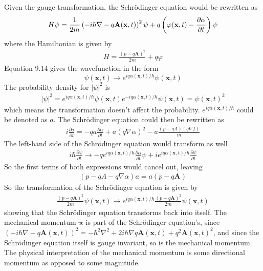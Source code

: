 \documentclass[10pt,letterpaper]{article}
\begin{document}
\begin{enumerate}
\color{violet}
Given the gauge transformation, the Schrödinger equation would be rewritten as
\begin{gather*}
H\psi = \frac{1}{2m} \left( -i\hbar\nabla - q\text{\textbf{A}}(\text{\textbf{x}}, t) \right)^{2}\psi + q\left( \varphi(\textbf{x}, t) - \frac{\partial \alpha}{\partial t} \right)\psi
\end{gather*}
where the Hamiltonian is given by
\begin{gather*}
H = \frac{(p - q\textbf{A})^{2}}{2m} + q\varphi
\end{gather*}
Equation 9.14 gives the wavefunction in the form
$$\psi(\textbf{x}, t) \rightarrow e^{iq\alpha(\textbf{x}, t)/\hbar}\psi(\textbf{x}, t)$$
The probability density for $|\psi|^{2}$ is
\begin{gather*}
|\psi|^{2} = e^{iq\alpha(\textbf{x}, t)/\hbar}\psi(\textbf{x}, t) e^{-iq\alpha(\textbf{x}, t)/\hbar}\psi(\textbf{x}, t) = \psi(\textbf{x}, t)^{2}
\end{gather*}
which means the transformation doesn't affect the probability. $e^{iq\alpha(\textbf{x}, t)/\hbar}$ could be denoted as $a$. The Schrödinger equation could then be rewritten as
\begin{gather*}
i\frac{\partial a}{\partial t} = -qa\frac{\partial \alpha}{\partial t} + a(q\nabla\alpha)^{2} - a\frac{(p - qA)(q\nabla f)}{m}
\end{gather*}
The left-hand side of the Schrödinger equation would transform as well
\begin{gather*}
i\hbar\frac{\partial \psi}{\partial t} \rightarrow -qe^{iq\alpha(\textbf{x}, t)/\hbar}\frac{\partial \alpha}{\partial t}\psi + ie^{iq\alpha(\textbf{x}, t)/\hbar} \frac{\partial \psi}{\partial t}
\end{gather*}
So the first terms of both expressions would cancel out, leaving
\begin{gather*}
(p - qA - q\nabla\alpha)a = a(p - q\textbf{A})
\end{gather*}
So the transformation of the Schrödinger equation is given by
\begin{gather*}
\frac{(p - q\textbf{A})^{2}}{2m}\psi(\textbf{x}, t) \rightarrow e^{iq\alpha(\textbf{x}, t)/\hbar}\frac{(p - q\textbf{A})^{2}}{2m}\psi(\textbf{x}, t)
\end{gather*}
showing that the Schrödinger equation transforms back into itself. The mechanical momentum $\boldsymbol{\pi}$ is part of the Schrödinger equation's, since $(-i\hbar\nabla - q\textbf{A}(\textbf{x}, t))^{2} = -\hbar^{2}\nabla^{2} + 2i\hbar\nabla q\textbf{A}(\textbf{x}, t) + q^{2}\textbf{A}(\textbf{x}, t)^{2}$, and since the Schrödinger equation itself is gauge invariant, so is the mechanical momentum. The physical interpretation of the mechanical momentum is some directional momentum as opposed to some magnitude. 
\color{black}


\end{enumerate}
\end{document}
